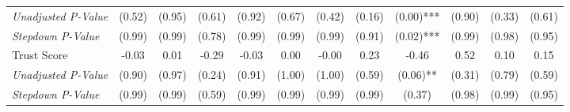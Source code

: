 \begin{tabular}{l c c c c c c c c c c c}
\quad \textit{Unadjusted P-Value} & (0.52) & (0.95) & (0.61) & (0.92) & (0.67) & (0.42) & (0.16) & (0.00)*** & (0.90) & (0.33) & (0.61) \\
\quad \textit{Stepdown P-Value} & (0.99) & (0.99) & (0.78) & (0.99) & (0.99) & (0.99) & (0.91) & (0.02)*** & (0.99) & (0.98) & (0.95) \\
Trust Score & -0.03 & 0.01 & -0.29 & -0.03 & 0.00 & -0.00 & 0.23 & -0.46 & 0.52 & 0.10 & 0.15 \\
\quad \textit{Unadjusted P-Value} & (0.90) & (0.97) & (0.24) & (0.91) & (1.00) & (1.00) & (0.59) & (0.06)** & (0.31) & (0.79) & (0.59) \\
\quad \textit{Stepdown P-Value} & (0.99) & (0.99) & (0.59) & (0.99) & (0.99) & (0.99) & (0.99) & (0.37) & (0.98) & (0.99) & (0.95) \\
\bottomrule
\end{tabular}
